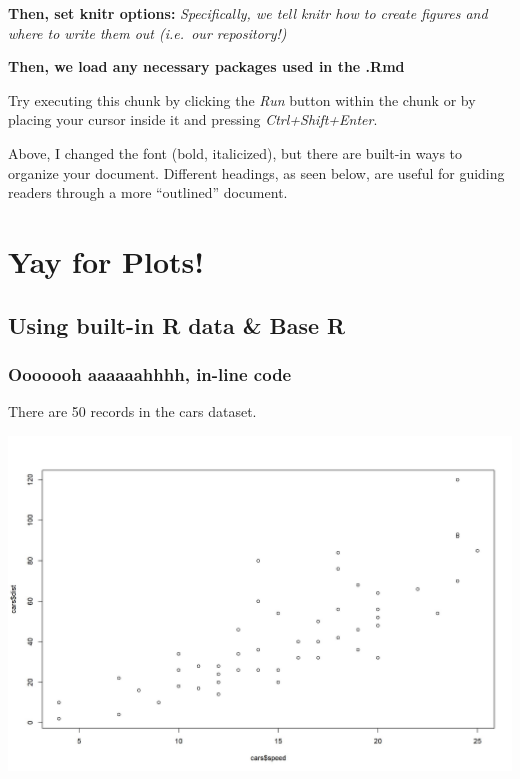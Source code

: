 \documentclass[
]{article}
\newenvironment{Shaded}{\begin{snugshade}}{\end{snugshade}}
\newcommand{\CommentTok}[1]{\textcolor[rgb]{0.56,0.35,0.01}{\textit{#1}}}
\newcommand{\FunctionTok}[1]{\textcolor[rgb]{0.00,0.00,0.00}{#1}}
\newcommand{\NormalTok}[1]{#1}
\newcommand{\SpecialCharTok}[1]{\textcolor[rgb]{0.00,0.00,0.00}{#1}}
\begin{document}
\textbf{Then, set knitr options:} \emph{Specifically, we tell knitr how
to create figures and where to write them out (i.e.~our repository!)}

\textbf{Then, we load any necessary packages used in the .Rmd}

Try executing this chunk by clicking the \emph{Run} button within the
chunk or by placing your cursor inside it and pressing
\emph{Ctrl+Shift+Enter}.

Above, I changed the font (bold, italicized), but there are built-in
ways to organize your document. Different headings, as seen below, are
useful for guiding readers through a more ``outlined'' document.

\hypertarget{yay-for-plots}{%
\section{Yay for Plots!}\label{yay-for-plots}}

\hypertarget{using-built-in-r-data-base-r}{%
\subsection{Using built-in R data \& Base
R}\label{using-built-in-r-data-base-r}}

\hypertarget{ooooooh-aaaaaahhhh-in-line-code}{%
\subsubsection{Ooooooh aaaaaahhhh, in-line
code}\label{ooooooh-aaaaaahhhh-in-line-code}}

There are 50 records in the cars dataset.

\begin{Shaded}
\end{Shaded}

\includegraphics{figures/Cars-speed_dist-1.jpeg}
\end{document}
